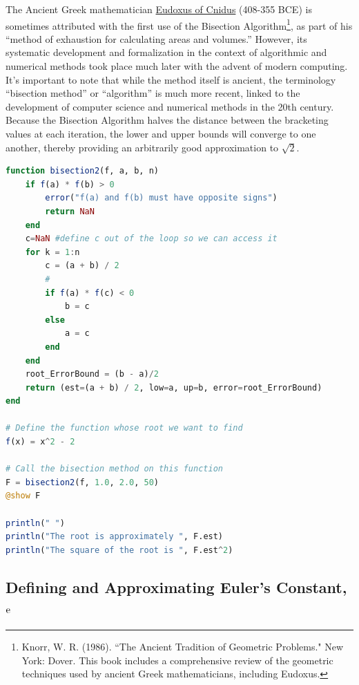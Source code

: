 \begin{rem}
The Ancient Greek mathematician \href{https://en.wikipedia.org/wiki/Eudoxus_of_Cnidus}{Eudoxus of Cnidus} (408-355 BCE) is sometimes attributed with the first use of the Bisection Algorithm\footnote{Knorr, W. R. (1986). ``The Ancient Tradition of Geometric Problems." New York: Dover. This book includes a comprehensive review of the geometric techniques used by ancient Greek mathematicians, including Eudoxus.}, as part of his ``method of exhaustion for calculating areas and volumes.'' However, its systematic development and formalization in the context of algorithmic and numerical methods took place much later with the advent of modern computing. It's important to note that while the method itself is ancient, the terminology ``bisection method'' or ``algorithm'' is much more recent, linked to the development of computer science and numerical methods in the 20th century. Because the Bisection Algorithm halves the distance between the bracketing values at each iteration, the lower and upper bounds will converge to one another, thereby providing an arbitrarily good approximation to $\sqrt{2}$. 
\end{rem}

\begin{lstlisting}[language=Julia,style=mystyle]
function bisection2(f, a, b, n)
    if f(a) * f(b) > 0
        error("f(a) and f(b) must have opposite signs")
        return NaN
    end
    c=NaN #define c out of the loop so we can access it
    for k = 1:n
        c = (a + b) / 2
        #
        if f(a) * f(c) < 0
            b = c
        else
            a = c
        end
    end
    root_ErrorBound = (b - a)/2
    return (est=(a + b) / 2, low=a, up=b, error=root_ErrorBound)
end

# Define the function whose root we want to find
f(x) = x^2 - 2

# Call the bisection method on this function
F = bisection2(f, 1.0, 2.0, 50)
@show F

println(" ")
println("The root is approximately ", F.est)
println("The square of the root is ", F.est^2)
\end{lstlisting}

\subsection{Defining and Approximating Euler's Constant, \texorpdfstring{$\rm e$}{e}}



